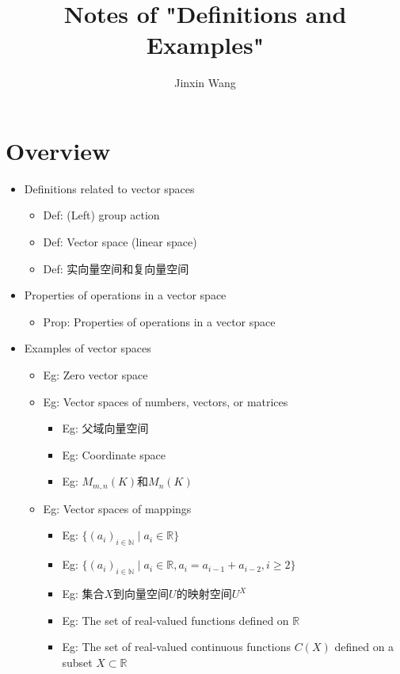 \documentclass[onecolumn]{ctexart}
\title{Notes of "Definitions and Examples"}
\author{Jinxin Wang}
\date{}
\begin{document}
\maketitle

\section{Overview}
\begin{itemize}
  \item Definitions related to vector spaces
  \begin{itemize}
    \item Def: (Left) group action
    \item Def: Vector space (linear space)
    \item Def: 实向量空间和复向量空间
  \end{itemize}
  \item Properties of operations in a vector space
  \begin{itemize}
    \item Prop: Properties of operations in a vector space
  \end{itemize}
  \item Examples of vector spaces
  \begin{itemize}
    \item Eg: Zero vector space
    \item Eg: Vector spaces of numbers, vectors, or matrices
    \begin{itemize}
      \item Eg: 父域向量空间
      \item Eg: Coordinate space
      \item Eg: $M_{m,n}(K)$和$M_{n}(K)$
    \end{itemize}
    \item Eg: Vector spaces of mappings
    \begin{itemize}
      \item Eg: $\lbrace (a_i)_{i \in \mathbb{N}} \mid a_i \in \mathbb{R} \rbrace$
      \item Eg: $\lbrace (a_i)_{i \in \mathbb{N}} \mid a_i \in \mathbb{R}, a_i = a_{i-1} + a_{i-2}, i \geq 2 \rbrace$
      \item Eg: 集合$X$到向量空间$U$的映射空间$U^X$
      \item Eg: The set of real-valued functions defined on $\mathbb{R}$
      \item Eg: The set of real-valued continuous functions $C(X)$ defined on a subset $X \subset \mathbb{R}$

\end{itemize}
\end{itemize}
\end{itemize}
\end{document}
